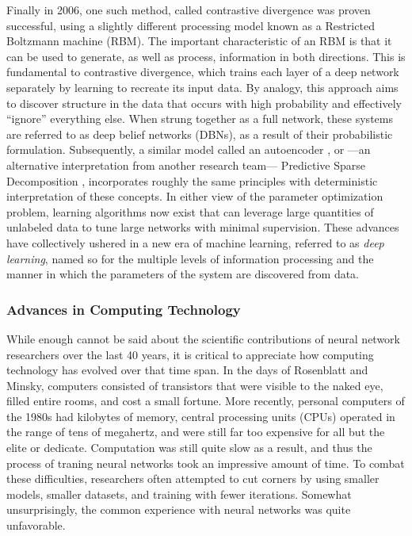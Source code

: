Finally in 2006, one such method, called contrastive divergence was proven successful, using a slightly different processing model known as a Restricted Boltzmann machine (RBM).
The important characteristic of an RBM is that it can be used to generate, as well as process, information in both directions.
This is fundamental to contrastive divergence, which trains each layer of a deep network separately by learning to recreate its input data.
By analogy, this approach aims to discover structure in the data that occurs with high probability and effectively ``ignore'' everything else.
When strung together as a full network, these systems are referred to as deep belief networks (DBNs), as a result of their probabilistic formulation.
Subsequently, a similar model called an autoencoder \cite{Vincent2010}, or ---an alternative interpretation from another research team--- Predictive Sparse Decomposition \cite{Ranzato2007}, incorporates roughly the same principles with deterministic interpretation of these concepts.
In either view of the parameter optimization problem, learning algorithms now exist that can leverage large quantities of unlabeled data to tune large networks with minimal supervision.
These advances have collectively ushered in a new era of machine learning, referred to as \emph{deep learning}, named so for the multiple levels of information processing and the manner in which the parameters of the system are discovered from data.


\subsubsection{Advances in Computing Technology}
\label{subsubsec:hardware}

While enough cannot be said about the scientific contributions of neural network researchers over the last 40 years, it is critical to appreciate how computing technology has evolved over that time span.
In the days of Rosenblatt and Minsky, computers consisted of transistors that were visible to the naked eye, filled entire rooms, and cost a small fortune.
More recently, personal computers of the 1980s had kilobytes of memory, central processing units (CPUs) operated in the range of tens of megahertz, and were still far too expensive for all but the elite or dedicate.
Computation was still quite slow as a result, and thus the process of traning neural networks took an impressive amount of time.
To combat these difficulties, researchers often attempted to cut corners by using smaller models, smaller datasets, and training with fewer iterations.
Somewhat unsurprisingly, the common experience with neural networks was quite unfavorable.

